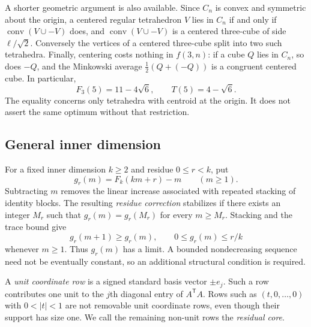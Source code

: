 \documentclass[11pt]{article}
\numberwithin{equation}{section}
\theoremstyle{definition}
\theoremstyle{definition}
\newcommand{\F}{F_3}
\begin{document}
A shorter geometric argument is also available. Since $C_n$ is
convex and symmetric about the origin, a centered regular tetrahedron
$V$ lies in $C_n$ if and only if $\operatorname{conv}(V\cup -V)$
does, and $\operatorname{conv}(V\cup-V)$ is a centered three-cube
of side $\ell/\sqrt2$. Conversely the vertices of a centered
three-cube split into two such tetrahedra. Finally, centering costs
nothing in $f(3,n)$: if a cube $Q$ lies in $C_n$, so does $-Q$, and
the Minkowski average $\tfrac12(Q+(-Q))$ is a congruent centered cube.
In particular,
\[
 \F(5)=11-4\sqrt6,\qquad T(5)=4-\sqrt6.
\]
The equality concerns only tetrahedra with centroid at the
origin. It does not assert the same optimum without that
restriction.

\subsection{General inner dimension}
For a fixed inner dimension $k\ge2$ and residue $0\le r<k$,
put
\[
 g_r(m)=F_k(km+r)-m\qquad(m\ge1).
\]
Subtracting $m$ removes the linear increase associated with
repeated stacking of identity blocks. The resulting \emph{residue
correction} stabilizes if there exists an integer $M_r$ such that
$g_r(m)=g_r(M_r)$ for every $m\ge M_r$.
Stacking and the trace bound give
\[
 g_r(m+1)\ge g_r(m),\qquad 0\le g_r(m)\le r/k
\]
whenever $m\ge1$. Thus $g_r(m)$ has a limit.  A bounded nondecreasing sequence need
not be eventually constant, so an additional structural condition is
required.

A \emph{unit coordinate row} is a signed standard basis vector
$\pm e_j$.  Such a row contributes one unit to the $j$th diagonal
entry of $A^{\mathsf T}A$.  Rows such as $(t,0,\ldots,0)$ with
$0<|t|<1$ are not removable unit coordinate rows, even though
their support has size one.  We call the remaining non-unit rows
the \emph{residual core}.
\end{document}
